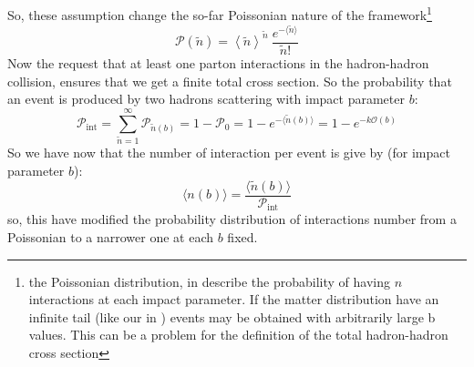 \medskip

So, these assumption change the so-far Poissonian nature of the framework\footnote{the Poissonian distribution, in  describe the probability of having $n$ interactions at each impact parameter. If the matter distribution have an infinite tail (like our in ) events may be obtained with arbitrarily large b values. This can be a problem for the definition of the total hadron-hadron cross section}
\begin{equation}
\mathcal{P}(\widetilde{n})=
	\left\langle \widetilde{n}\right\rangle ^{\widetilde{n}}\ \frac{e^{-\langle\widetilde{n}\rangle}}{\widetilde{n}!}
	\label{eq:poisson}
\end{equation}
Now the request that at least one parton interactions in the hadron-hadron collision, ensures that we get a finite total cross section. So the probability that an event is produced by two hadrons scattering with impact parameter $b$:
\begin{equation}
	\mathcal{P}_{\text{int}}= \displaystyle\sum_{\widetilde{n}=1}^\infty\mathcal{P}_{\widetilde{n}(b)}=1-\mathcal{P}_0=1-e^{-\langle \widetilde{n}(b) \rangle}=1-e^{-k\mathcal{O}(b)}
\end{equation}
So we have now that the number of interaction per event is give by (for impact parameter $b$):
\begin{equation}
	\langle n(b) \rangle=\frac{\langle \widetilde{n}(b) \rangle}{\mathcal{P}_{\text{int}}}
\end{equation}
so, this have modified the probability distribution of interactions number from a Poissonian to a narrower one at each $b$ fixed.

